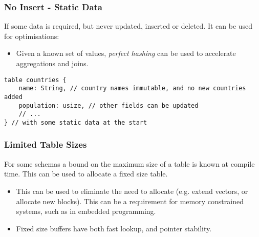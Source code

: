 \subsubsection{No Insert - Static Data}
If some data is required, but never updated, inserted or deleted. It can be used for optimisations:
\begin{itemize}
    \item Given a known set of values, \textit{perfect hashing} can be used to accelerate aggregations and joins.
\end{itemize} 
\begin{verbatim}
table countries {
    name: String, // country names immutable, and no new countries added 
    population: usize, // other fields can be updated
    // ...
} // with some static data at the start
\end{verbatim}

\subsubsection{Limited Table Sizes}
For some schemas a bound on the maximum size of a table is known at compile time. This can be used to allocate a fixed size table.
\begin{itemize}
    \setlength\itemsep{0em}
    \item This can be used to eliminate the need to allocate (e.g. extend vectors, or allocate new blocks). This can be a requirement for memory constrained systems, such as in embedded programming.
    \item Fixed size buffers have both fast lookup, and pointer stability.
\end{itemize}

